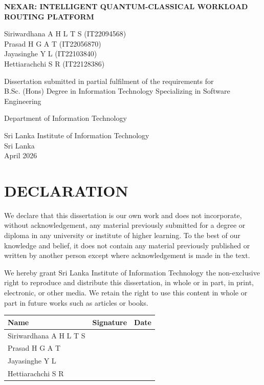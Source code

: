 \documentclass[12pt,a4paper]{report}
\newcommand{\projecttitle}{NEXAR: INTELLIGENT QUANTUM-CLASSICAL WORKLOAD ROUTING PLATFORM}
\newcommand{\degree}{B.Sc. (Hons) Degree in Information Technology Specializing in Software Engineering}
\newcommand{\department}{Department of Information Technology}
\newcommand{\university}{Sri Lanka Institute of Information Technology}
\newcommand{\submissionmonth}{April 2026}
\newcommand{\country}{Sri Lanka}
\newcommand{\titlepagedeclare}{Dissertation submitted in partial fulfilment of the requirements for}
\begin{document}
\hypersetup{pageanchor=false}

\begin{titlepage}
\centering
\vspace*{1.0cm}
{\bfseries\fontsize{16pt}{20pt}\selectfont \projecttitle\par}
\vspace{2.0cm}
{\fontsize{14pt}{18pt}\selectfont
Siriwardhana A H L T S (IT22094568)\\
Prasad H G A T (IT22056870)\\
Jayasinghe Y L (IT22103840)\\
Hettiarachchi S R (IT22128386)\par}
\vspace{2.0cm}
{\fontsize{12pt}{18pt}\selectfont
\titlepagedeclare\\
\degree\par}
\vspace{2.0cm}
{\fontsize{14pt}{18pt}\selectfont
\department\par}
\vspace{0.6cm}
{\fontsize{14pt}{18pt}\selectfont
\university\\
\country\\
\submissionmonth\par}
\end{titlepage}

\hypersetup{pageanchor=true}

\chapter*{DECLARATION}
We declare that this dissertation is our own work and does not incorporate, without acknowledgement, any material previously submitted for a degree or diploma in any university or institute of higher learning. To the best of our knowledge and belief, it does not contain any material previously published or written by another person except where acknowledgement is made in the text.

We hereby grant Sri Lanka Institute of Information Technology the non-exclusive right to reproduce and distribute this dissertation, in whole or in part, in print, electronic, or other media. We retain the right to use this content in whole or part in future works such as articles or books.

\vspace{1cm}
\begin{longtable}{p{}p{}p{}}
\toprule
\textbf{Name} & \textbf{Signature} & \textbf{Date} \\
\midrule
Siriwardhana A H L T S & & \\
\addlinespace[1.2cm]
Prasad H G A T & & \\
\addlinespace[1.2cm]
Jayasinghe Y L & & \\
\addlinespace[1.2cm]
Hettiarachchi S R & & \\
\bottomrule
\end{longtable}
\end{document}
